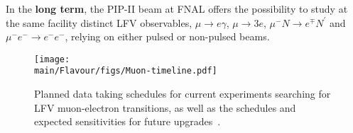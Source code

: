 In the {\bf long term}, the PIP-II beam at FNAL offers the possibility to study at the same facility distinct LFV observables, $\mu \to e\gamma$, $\mu \to 3e$, $\mu^- N\to e^\mp N^\prime$ and $\mu^- e^- \to e^- e^-$, relying on either pulsed or non-pulsed 
beams.  
\begin{figure}
\begin{center}
\texttt{[image: \\main/Flavour/figs/Muon-timeline.pdf]} 
\end{center}
\caption{Planned data taking schedules for current experiments searching for LFV muon-electron transitions, as well as the schedules and expected sensitivities for future upgrades~\cite{Baldini:2018uhj}.
  }\label{fig:cLFV:muon:chrono} 
\end{figure}


